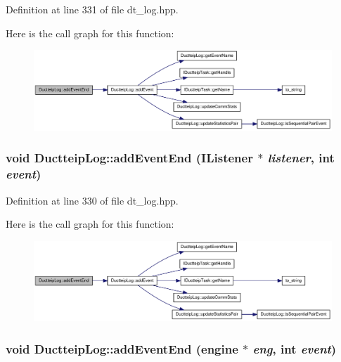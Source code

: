 Definition at line 331 of file dt\_\-log.hpp.

Here is the call graph for this function:\nopagebreak
\begin{figure}[H]
\begin{center}
\leavevmode
\includegraphics[width=369pt]{class_ductteip_log_a0a536783ee78831d30dc9dd6d41a674f_cgraph}
\end{center}
\end{figure}
\hypertarget{class_ductteip_log_a549a774edcd230c2e47b21e78133a168}{
\subsubsection[{addEventEnd}]{\setlength{\rightskip}{0pt plus 5cm}void DuctteipLog::addEventEnd ({\bf IListener} $\ast$ {\em listener}, \/  int {\em event})}}
\label{class_ductteip_log_a549a774edcd230c2e47b21e78133a168}


Definition at line 330 of file dt\_\-log.hpp.

Here is the call graph for this function:\nopagebreak
\begin{figure}[H]
\begin{center}
\leavevmode
\includegraphics[width=369pt]{class_ductteip_log_a549a774edcd230c2e47b21e78133a168_cgraph}
\end{center}
\end{figure}
\hypertarget{class_ductteip_log_a97b60b9f85253cdb916a0b2fed7b02ef}{
\subsubsection[{addEventEnd}]{\setlength{\rightskip}{0pt plus 5cm}void DuctteipLog::addEventEnd ({\bf engine} $\ast$ {\em eng}, \/  int {\em event})}}
\label{class_ductteip_log_a97b60b9f85253cdb916a0b2fed7b02ef}


